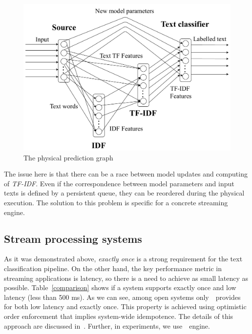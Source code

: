 \begin{figure}[htbp]
  \centering
  \includegraphics[scale=0.375]{pics/physical-graph}
  \caption{The physical prediction graph}
  \label {physical_graph}
\end{figure}

The issue here is that there can be a race between model updates and computing of {\em TF-IDF}. Even if the correspondence between model parameters and input texts is defined by a persistent queue, they can be reordered during the physical execution. The solution to this problem is specific for a concrete streaming engine.

\subsection{Stream processing systems}

As it was demonstrated above, {\em exactly once} is a strong requirement for the text classification pipeline. On the other hand, the key performance metric in streaming applications is latency, so there is a need to achieve as small latency as possible. Table~\ref{comparison} shows if a system supports exactly once and low latency (less than 500 ms). As we can see, among open systems only~\FlameStream\ provides for both low latency and exactly once. This property is achieved using optimistic order enforcement that implies system-wide idempotence. The details of this approach are discussed in~\cite{we2018adbis, we2018beyondmr}. Further, in experiments, we use~\FlameStream\ engine.

